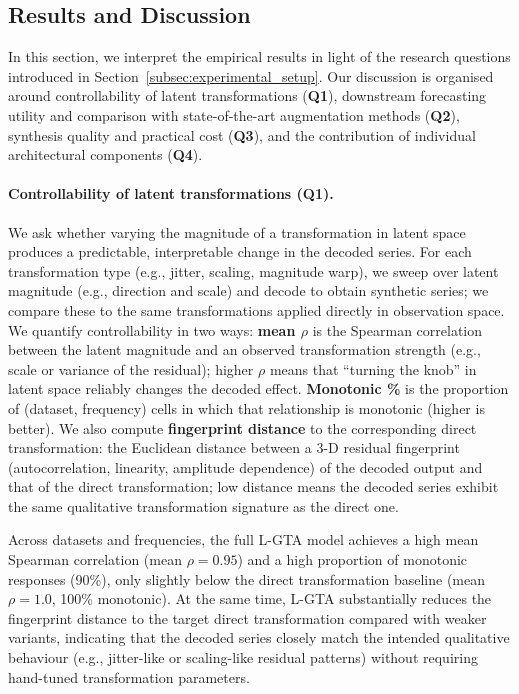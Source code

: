 \subsection{Results and Discussion}

In this section, we interpret the empirical results in light of the research questions introduced in Section~\ref{subsec:experimental_setup}. Our discussion is organised around controllability of latent transformations (\textbf{Q1}), downstream forecasting utility and comparison with state-of-the-art augmentation methods (\textbf{Q2}), synthesis quality and practical cost (\textbf{Q3}), and the contribution of individual architectural components (\textbf{Q4}).

\paragraph{Controllability of latent transformations (Q1).}
We ask whether varying the magnitude of a transformation in latent space produces a predictable, interpretable change in the decoded series. For each transformation type (e.g., jitter, scaling, magnitude warp), we sweep over latent magnitude (e.g., direction and scale) and decode to obtain synthetic series; we compare these to the same transformations applied directly in observation space. We quantify controllability in two ways: \textbf{mean $\rho$} is the Spearman correlation between the latent magnitude and an observed transformation strength (e.g., scale or variance of the residual); higher $\rho$ means that ``turning the knob'' in latent space reliably changes the decoded effect. \textbf{Monotonic \%} is the proportion of (dataset, frequency) cells in which that relationship is monotonic (higher is better). We also compute \textbf{fingerprint distance} to the corresponding direct transformation: the Euclidean distance between a 3-D residual fingerprint (autocorrelation, linearity, amplitude dependence) of the decoded output and that of the direct transformation; low distance means the decoded series exhibit the same qualitative transformation signature as the direct one.

Across datasets and frequencies, the full L-GTA model achieves a high mean Spearman correlation (mean $\rho = 0.95$) and a high proportion of monotonic responses (90\%), only slightly below the direct transformation baseline (mean $\rho = 1.0$, 100\% monotonic). At the same time, L-GTA substantially reduces the fingerprint distance to the target direct transformation compared with weaker variants, indicating that the decoded series closely match the intended qualitative behaviour (e.g., jitter-like or scaling-like residual patterns) without requiring hand-tuned transformation parameters.

